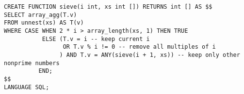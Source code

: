 \begin{verbatim}
CREATE FUNCTION sieve(i int, xs int []) RETURNS int [] AS $$
SELECT array_agg(T.v)
FROM unnest(xs) AS T(v)
WHERE CASE WHEN 2 * i > array_length(xs, 1) THEN TRUE
           ELSE (T.v = i -- keep current i
                 OR T.v % i != 0 -- remove all multiples of i
                ) AND T.v = ANY(sieve(i + 1, xs)) -- keep only other nonprime numbers
          END;
$$
LANGUAGE SQL;
\end{verbatim}